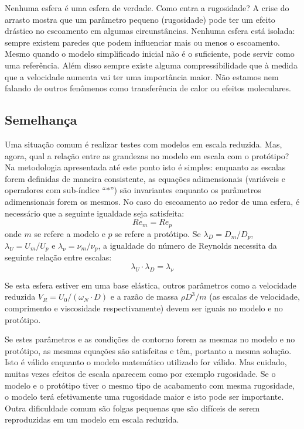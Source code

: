 Nenhuma esfera é uma esfera de verdade. Como entra a rugosidade? A crise do arrasto mostra que um parâmetro pequeno (rugosidade) pode ter um efeito drástico no escoamento em algumas circunstâncias. Nenhuma esfera está isolada: sempre existem paredes que podem influenciar mais ou menos o escoamento. Mesmo quando o modelo simplificado inicial não é o suficiente, pode servir como uma referência. Além disso sempre existe alguma compressibilidade que à medida que a velocidade aumenta vai ter uma importância maior. Não estamos nem falando de outros fenômenos como transferência de calor ou efeitos moleculares.


\subsection{Semelhança}

Uma situação comum é realizar testes com modelos em escala reduzida. Mas, agora, qual a relação entre as grandezas no modelo em escala com o protótipo? Na metodologia apresentada até este ponto isto é simples: enquanto as escalas forem definidas de maneira consistente, as equações adimensionais (variáveis e operadores com sub-índice ``$*$'') são invariantes enquanto os parâmetros adimensionais forem os mesmos. No caso do escoamento ao redor de uma esfera, é necessário que a seguinte igualdade seja satisfeita:
\[
Re_m = Re_p
\]
onde $m$ se refere a modelo e $p$ se refere a protótipo. Se $\lambda_D = D_m/D_p$, $\lambda_U = U_m/U_p$ e $\lambda_\nu = \nu_m/\nu_p$, a igualdade do número de Reynolds necessita da seguinte relação entre escalas:
\[
\lambda_U\cdot\lambda_D = \lambda_\nu
\]



Se esta esfera estiver em uma base elástica, outros parâmetros como a velocidade reduzida $V_R = U_0/(\omega_N\cdot D)$  e a razão de massa $\rho D^3/m$ (as escalas de velocidade, comprimento e viscosidade respectivamente) devem ser iguais no modelo e no protótipo. 

Se estes parâmetros e as condições de contorno forem as mesmas no modelo e no protótipo, as mesmas equações são satisfeitas e têm, portanto a mesma solução. Isto é válido enquanto o modelo matemático utilizado for válido. Mas cuidado, muitas vezes efeitos de escala aparecem como por exemplo rugosidade. Se o modelo e o protótipo tiver o mesmo tipo de acabamento com mesma rugosidade, o modelo terá efetivamente uma rugosidade maior e isto pode ser importante. Outra dificuldade comum são folgas pequenas que são difíceis de serem reproduzidas em um modelo em escala reduzida.
